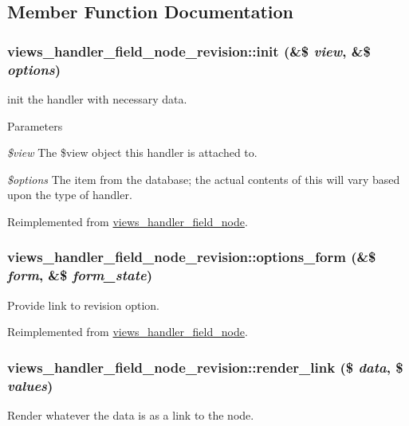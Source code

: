 \subsection{Member Function Documentation}
\hypertarget{classviews__handler__field__node__revision_aa89b3130f87bc8811d777a29f8e4468c}{
\subsubsection[{init}]{\setlength{\rightskip}{0pt plus 5cm}views\_\-handler\_\-field\_\-node\_\-revision::init (\&\$ {\em view}, \/  \&\$ {\em options})}}
\label{classviews__handler__field__node__revision_aa89b3130f87bc8811d777a29f8e4468c}
init the handler with necessary data. 
\begin{DoxyParams}{Parameters}
\item[{\em \$view}]The \$view object this handler is attached to. \item[{\em \$options}]The item from the database; the actual contents of this will vary based upon the type of handler. \end{DoxyParams}


Reimplemented from \hyperlink{classviews__handler__field__node_a4f263bde5682e4c2285a0e51a7f8b472}{views\_\-handler\_\-field\_\-node}.\hypertarget{classviews__handler__field__node__revision_a81c730d40af84b9309664ae8c7992429}{
\subsubsection[{options\_\-form}]{\setlength{\rightskip}{0pt plus 5cm}views\_\-handler\_\-field\_\-node\_\-revision::options\_\-form (\&\$ {\em form}, \/  \&\$ {\em form\_\-state})}}
\label{classviews__handler__field__node__revision_a81c730d40af84b9309664ae8c7992429}
Provide link to revision option. 

Reimplemented from \hyperlink{classviews__handler__field__node_af3d8a04be282a20079ea4fb82e768910}{views\_\-handler\_\-field\_\-node}.\hypertarget{classviews__handler__field__node__revision_aefde40c1e00a13cfdf184f31ff07c25b}{
\subsubsection[{render\_\-link}]{\setlength{\rightskip}{0pt plus 5cm}views\_\-handler\_\-field\_\-node\_\-revision::render\_\-link (\$ {\em data}, \/  \$ {\em values})}}
\label{classviews__handler__field__node__revision_aefde40c1e00a13cfdf184f31ff07c25b}
Render whatever the data is as a link to the node.

